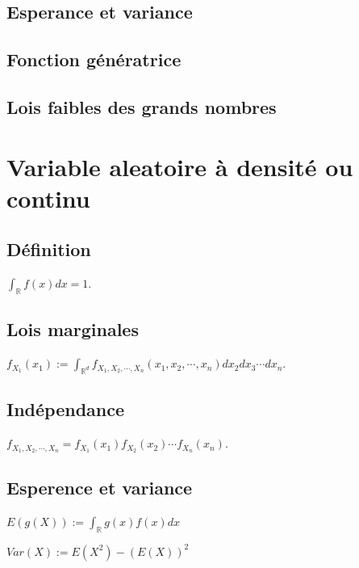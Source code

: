 \documentclass[a4paper, 12pt, french]{report}
\theoremstyle{break}
\begin{document}
\section{Esperance et variance}

\section{Fonction génératrice}

\section{Lois faibles des grands nombres}

\chapter{Variable aleatoire à densité ou continu}

\section{Définition}
$\displaystyle \int_{\mathbb{R}} f(x) dx = 1$.

\section{Lois marginales}
$ \displaystyle f_{X_{1}}(x_{1}) := \int_{\mathbb{R}^{d}} f_{X_{1}, X_{2}, \cdots, X_{n}}(x_{1}, x_{2}, \cdots, x_{n}) dx_{2}dx_{3}\cdots dx_{n}$.

\section{Indépendance}
$\displaystyle f_{X_{1}, X_{2}, \cdots, X_{n}} = f_{X_{1}}(x_{1})f_{X_{2}}(x_{2}) \cdots f_{X_{n}}(x_{n})$.

\section{Esperence et variance}
$\displaystyle E(g(X)) := \int_{\mathbb{R}} g(x)f(x) dx$

$\displaystyle Var(X) := E(X^{2}) - (E(X))^{2}$
\end{document}
